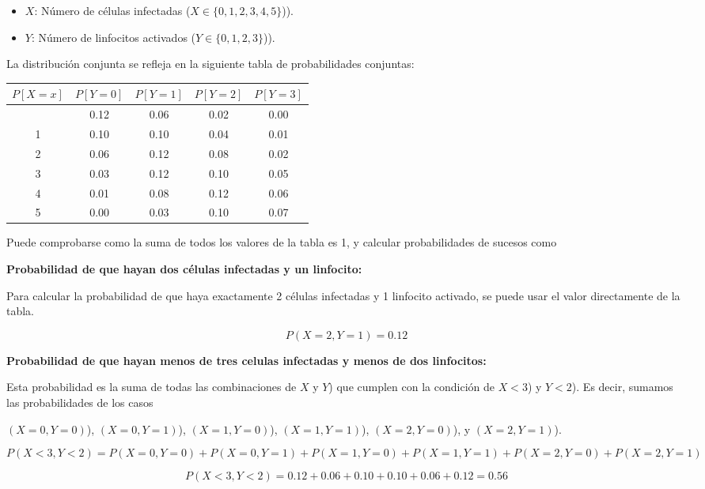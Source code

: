 \documentclass[
]{article}
\providecommand{\tightlist}{%
  \setlength{\itemsep}{0pt}\setlength{\parskip}{0pt}}
\begin{document}
\begin{itemize}
\tightlist
\item
  \(X\): Número de células infectadas (\(X \in \{0, 1, 2, 3, 4, 5\}\))).
\item
  \(Y\): Número de linfocitos activados (\(Y \in \{0, 1, 2, 3\}\))).
\end{itemize}

La distribución conjunta se refleja en la siguiente tabla de probabilidades conjuntas:

\begin{longtable}[]{@{}ccccc@{}}
\toprule\noalign{}
\(P[X=x]\) & \(P[Y = 0]\) & \(P[Y = 1]\) & \(P[Y = 2]\) & \(P[Y = 3]\) \\
\midrule\noalign{}
\endhead
\bottomrule\noalign{}
\endlastfoot
0 & 0.12 & 0.06 & 0.02 & 0.00 \\
1 & 0.10 & 0.10 & 0.04 & 0.01 \\
2 & 0.06 & 0.12 & 0.08 & 0.02 \\
3 & 0.03 & 0.12 & 0.10 & 0.05 \\
4 & 0.01 & 0.08 & 0.12 & 0.06 \\
5 & 0.00 & 0.03 & 0.10 & 0.07 \\
\end{longtable}

Puede comprobarse como la suma de todos los valores de la tabla es 1, y calcular probabilidades de sucesos como

\textbf{Probabilidad de que hayan dos células infectadas y un linfocito:}

Para calcular la probabilidad de que haya exactamente 2 células infectadas y 1 linfocito activado, se puede usar el valor directamente de la tabla.

\[
P(X = 2, Y = 1) = 0.12
\]

\textbf{Probabilidad de que hayan menos de tres celulas infectadas y menos de dos linfocitos:}

Esta probabilidad es la suma de todas las combinaciones de \(X\) y \(Y\)) que cumplen con la condición de \(X < 3\)) y \(Y < 2\)). Es decir, sumamos las probabilidades de los casos

\((X = 0, Y = 0)\)), \((X = 0, Y = 1)\)), \((X = 1, Y = 0)\)), \((X = 1, Y = 1)\)), \((X = 2, Y = 0)\)), y \((X = 2, Y = 1)\)).

\[
P(X < 3, Y < 2) = P(X = 0, Y = 0) + P(X = 0, Y = 1) + P(X = 1, Y = 0) + P(X = 1, Y = 1) + P(X = 2, Y = 0) + P(X = 2, Y = 1)
\]

\[
P(X < 3, Y < 2) = 0.12 + 0.06 + 0.10 + 0.10 + 0.06 + 0.12 = 0.56
\]
\end{document}
